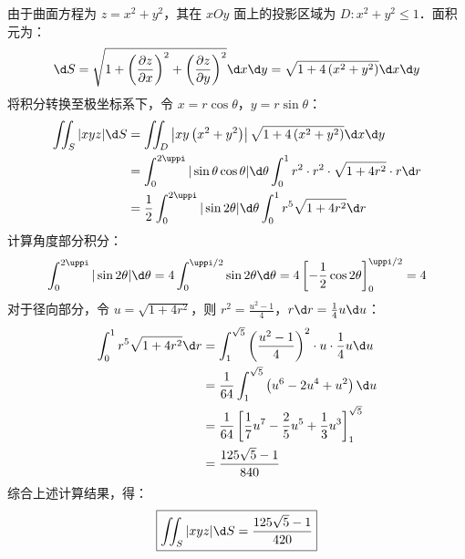 \begin{solution}

    由于曲面方程为 $z=x^{2}+y^{2}$，其在 $xOy$ 面上的投影区域为 $D: x^{2}+y^{2} \leqslant 1$．面积元为：
    \begin{equation}
        \d S = \sqrt{1+\left(\frac{\partial z}{\partial x}\right)^{2}+\left(\frac{\partial z}{\partial y}\right)^{2}} \d x \d y = \sqrt{1+4\left(x^{2}+y^{2}\right)} \d x \d y
    \end{equation}
    将积分转换至极坐标系下，令 $x=r \cos \theta$，$y=r \sin \theta$：
    \begin{equation}
        \begin{aligned}
            \iint_{S}|x y z| \d S & = \iint_{D}\left|x y\left(x^{2}+y^{2}\right)\right| \sqrt{1+4\left(x^{2}+y^{2}\right)} \d x \d y                           \\
                                  & = \int_{0}^{2 \uppi}|\sin \theta \cos \theta| \d \theta \int_{0}^{1} r^{2} \cdot r^{2} \cdot \sqrt{1+4 r^{2}} \cdot r \d r \\
                                  & = \frac{1}{2} \int_{0}^{2 \uppi}|\sin 2 \theta| \d \theta \int_{0}^{1} r^{5} \sqrt{1+4 r^{2}} \d r
        \end{aligned}
    \end{equation}
    计算角度部分积分：
    \begin{equation}
        \int_{0}^{2 \uppi}|\sin 2 \theta| \d \theta = 4 \int_{0}^{\uppi / 2} \sin 2 \theta \d \theta = 4 \left[ -\frac{1}{2} \cos 2 \theta \right]_{0}^{\uppi / 2} = 4
    \end{equation}
    对于径向部分，令 $u=\sqrt{1+4 r^{2}}$，则 $r^{2}=\frac{u^{2}-1}{4}$，$r \d r = \frac{1}{4} u \d u$：
    \begin{equation}
        \begin{aligned}
            \int_{0}^{1} r^{5} \sqrt{1+4 r^{2}} \d r & = \int_{1}^{\sqrt{5}}\left(\frac{u^{2}-1}{4}\right)^{2} \cdot u \cdot \frac{1}{4} u \d u        \\
                                                     & = \frac{1}{64} \int_{1}^{\sqrt{5}}\left(u^{6}-2 u^{4}+u^{2}\right) \d u                         \\
                                                     & = \frac{1}{64}\left[\frac{1}{7} u^{7}-\frac{2}{5} u^{5}+\frac{1}{3} u^{3}\right]_{1}^{\sqrt{5}} \\
                                                     & = \frac{125 \sqrt{5}-1}{840}
        \end{aligned}
    \end{equation}
    综合上述计算结果，得：
    \begin{equation}
        \boxed{\iint_{S}|x y z| \d S = \frac{125 \sqrt{5}-1}{420}}
    \end{equation}
\end{solution}

